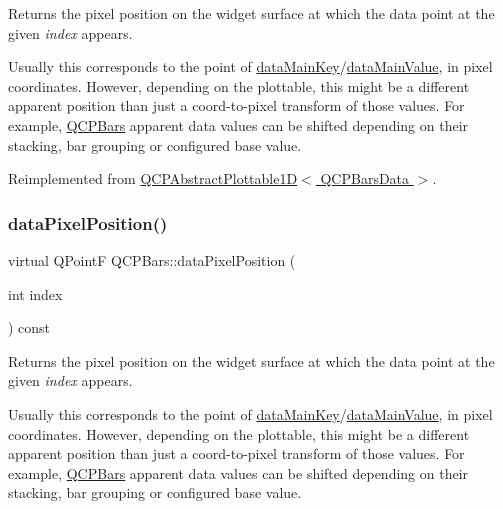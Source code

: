Returns the pixel position on the widget surface at which the data point at the given {\itshape index} appears.

Usually this corresponds to the point of \hyperlink{class_q_c_p_abstract_plottable1_d_ab14ab428595856bf76e04499017fa8dc}{data\+Main\+Key}/\hyperlink{class_q_c_p_abstract_plottable1_d_a0f913bb0889ca7cb574657a078fc8cff}{data\+Main\+Value}, in pixel coordinates. However, depending on the plottable, this might be a different apparent position than just a coord-\/to-\/pixel transform of those values. For example, \hyperlink{class_q_c_p_bars}{Q\+C\+P\+Bars} apparent data values can be shifted depending on their stacking, bar grouping or configured base value. 

Reimplemented from \hyperlink{class_q_c_p_abstract_plottable1_d_a14cf167457cda163575e6eec2a0b178d}{Q\+C\+P\+Abstract\+Plottable1\+D$<$ Q\+C\+P\+Bars\+Data $>$}.

\mbox{\label{class_q_c_p_bars_a71faeb70a3834f1f391c1a7e11c9fce7}} 
\subsubsection{\texorpdfstring{data\+Pixel\+Position()}{dataPixelPosition()}\hspace{0.1cm}{\footnotesize\ttfamily [2/2]}}
{\footnotesize\ttfamily virtual Q\+PointF Q\+C\+P\+Bars\+::data\+Pixel\+Position (\begin{DoxyParamCaption}\item[{int}]{index }\end{DoxyParamCaption}) const\hspace{0.3cm}{\ttfamily [virtual]}}





Returns the pixel position on the widget surface at which the data point at the given {\itshape index} appears.

Usually this corresponds to the point of \hyperlink{class_q_c_p_abstract_plottable1_d_ab14ab428595856bf76e04499017fa8dc}{data\+Main\+Key}/\hyperlink{class_q_c_p_abstract_plottable1_d_a0f913bb0889ca7cb574657a078fc8cff}{data\+Main\+Value}, in pixel coordinates. However, depending on the plottable, this might be a different apparent position than just a coord-\/to-\/pixel transform of those values. For example, \hyperlink{class_q_c_p_bars}{Q\+C\+P\+Bars} apparent data values can be shifted depending on their stacking, bar grouping or configured base value. 

